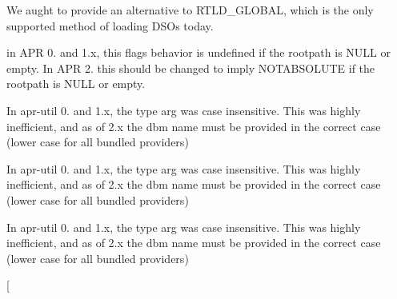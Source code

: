 \begin{DoxyRefList}
\item[\label{bug__bug000010}%
\hypertarget{bug__bug000010}{}%
Global \hyperlink{group__apr__user_ga57b4c6adc3e9d22eeaeb32c8faafcc83}{A\+P\+R\+\_\+\+D\+E\+C\+L\+A\+RE} (apr\+\_\+status\+\_\+t) apr\+\_\+uid\+\_\+current(apr\+\_\+uid\+\_\+t $\ast$userid]We aught to provide an alternative to R\+T\+L\+D\+\_\+\+G\+L\+O\+B\+AL, which is the only supported method of loading D\+S\+Os today.  
\item[\label{bug__bug000011}%
\hypertarget{bug__bug000011}{}%
Global \hyperlink{group__apr__filepath_gabb57ce7b23caf512d7f64b92a662ab3d}{A\+P\+R\+\_\+\+F\+I\+L\+E\+P\+A\+T\+H\+\_\+\+N\+O\+T\+A\+B\+O\+V\+E\+R\+O\+OT} ]in A\+PR 0. and 1.\+x, this flag\textquotesingle{}s behavior is undefined if the rootpath is N\+U\+LL or empty. In A\+PR 2. this should be changed to imply N\+O\+T\+A\+B\+S\+O\+L\+U\+TE if the rootpath is N\+U\+LL or empty.  
\item[\label{bug__bug000019}%
\hypertarget{bug__bug000019}{}%
Global \hyperlink{group__APR__Util__XML_ga4f95eb2fce8f447db01a30585adbd6dc}{A\+P\+U\+\_\+\+D\+E\+C\+L\+A\+RE} (apr\+\_\+status\+\_\+t) apr\+\_\+xml\+\_\+parse\+\_\+file(\hyperlink{structapr__pool__t}{apr\+\_\+pool\+\_\+t} $\ast$p]In apr-\/util 0. and 1.\+x, the type arg was case insensitive. This was highly inefficient, and as of 2.\+x the dbm name must be provided in the correct case (lower case for all bundled providers)  
\item[\label{bug__bug000019}%
\hypertarget{bug__bug000019}{}%
Global \hyperlink{group__APR__Util__XML_ga4f95eb2fce8f447db01a30585adbd6dc}{A\+P\+U\+\_\+\+D\+E\+C\+L\+A\+RE} (apr\+\_\+status\+\_\+t) apr\+\_\+xml\+\_\+parse\+\_\+file(\hyperlink{structapr__pool__t}{apr\+\_\+pool\+\_\+t} $\ast$p]In apr-\/util 0. and 1.\+x, the type arg was case insensitive. This was highly inefficient, and as of 2.\+x the dbm name must be provided in the correct case (lower case for all bundled providers)  
\item[\label{bug__bug000019}%
\hypertarget{bug__bug000019}{}%
Global \hyperlink{group__APR__Util__XML_ga4f95eb2fce8f447db01a30585adbd6dc}{A\+P\+U\+\_\+\+D\+E\+C\+L\+A\+RE} (apr\+\_\+status\+\_\+t) apr\+\_\+xml\+\_\+parse\+\_\+file(\hyperlink{structapr__pool__t}{apr\+\_\+pool\+\_\+t} $\ast$p]In apr-\/util 0. and 1.\+x, the type arg was case insensitive. This was highly inefficient, and as of 2.\+x the dbm name must be provided in the correct case (lower case for all bundled providers)  
\item[\label{bug__bug000019}%
\hypertarget{bug__bug000019}{}%

\end{DoxyRefList}
